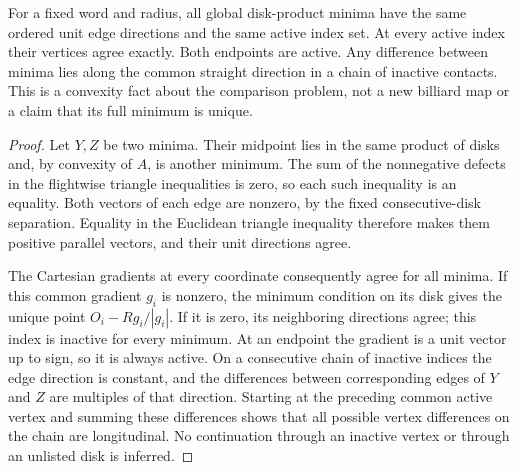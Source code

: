 \begin{lemma}
\label{lem:ae-common-minima}
For a fixed word and radius, all global disk-product minima have the
same ordered unit edge directions and the same active index set.
At every active index their vertices agree exactly.  Both endpoints
are active.  Any difference between minima lies along the common
straight direction in a chain of inactive contacts.  This is a
convexity fact about the comparison problem, not a new billiard map
or a claim that its full minimum is unique.
\end{lemma}
\begin{proof}
Let $Y,Z$ be two minima.  Their midpoint lies in the same product of
disks and, by convexity of $A$, is another minimum.  The sum of the
nonnegative defects in the flightwise triangle inequalities is zero,
so each such inequality is an equality.  Both vectors of each edge
are nonzero, by the fixed consecutive-disk separation.  Equality in
the Euclidean triangle inequality therefore makes them positive
parallel vectors, and their unit directions agree.

The Cartesian gradients at every coordinate consequently agree for
all minima.  If this common gradient $g_i$ is nonzero, the minimum
condition on its disk gives the unique point
$O_i-Rg_i/|g_i|$.  If it is zero, its neighboring directions agree;
this index is inactive for every minimum.  At an endpoint the gradient
is a unit vector up to sign, so it is always active.  On a consecutive
chain of inactive indices the edge direction is constant, and the
differences between corresponding edges of $Y$ and $Z$ are multiples
of that direction.  Starting at the preceding common active vertex
and summing these differences shows that all possible vertex
differences on the chain are longitudinal.  No continuation through
an inactive vertex or through an unlisted disk is inferred.
\end{proof}

